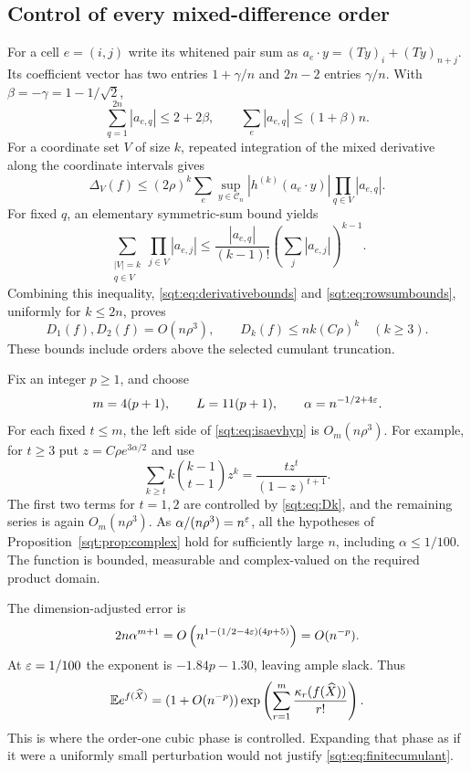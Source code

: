 \subsection{Control of every mixed-difference order}
For a cell $e=(i,j)$ write its whitened pair sum as $a_e\cdot y=(Ty)_i+(Ty)_{n+j}$. Its coefficient vector has two entries $1+\gamma/n$ and $2n-2$ entries $\gamma/n$. With $\beta=-\gamma=1-1/\sqrt2$,
\begin{equation}\label{sqt:eq:rowsumbounds}
\sum_{q=1}^{2n}|a_{e,q}|\leq2+2\beta,\qquad
\sum_e|a_{e,q}|\leq(1+\beta)n.
\end{equation}
For a coordinate set $V$ of size $k$, repeated integration of the mixed derivative along the coordinate intervals gives
\[
\Delta_V(f)\leq(2\rho)^k\sum_e
 \sup_{y\in\mathcal C_n}|h^{(k)}(a_e\cdot y)|
 \prod_{q\in V}|a_{e,q}|.
\]
For fixed $q$, an elementary symmetric-sum bound yields
\[
\sum_{\substack{|V|=k\\q\in V}}\prod_{j\in V}|a_{e,j}|
 \leq\frac{|a_{e,q}|}{(k-1)!}\left(\sum_j|a_{e,j}|\right)^{k-1}.
\]
Combining this inequality, \eqref{sqt:eq:derivativebounds} and \eqref{sqt:eq:rowsumbounds}, uniformly for $k\leq2n$, proves
\begin{equation}\label{sqt:eq:Dk}
D_1(f),D_2(f)=O(n\rho^3),\qquad
D_k(f)\leq nk(C\rho)^k\quad(k\geq3).
\end{equation}
These bounds include orders above the selected cumulant truncation.

Fix an integer $p\geq1$, and choose
\begin{equation}\label{sqt:eq:cutofforders}
m=4(p+1),\qquad L=11(p+1),\qquad\alpha=n^{-1/2+4\varepsilon}.
\end{equation}
For each fixed $t\leq m$, the left side of \eqref{sqt:eq:isaevhyp} is $O_m(n\rho^3)$. For example, for $t\geq3$ put $z=C\rho e^{3\alpha/2}$ and use
\[
\sum_{k\geq t}k\binom{k-1}{t-1}z^k
 =\frac{tz^t}{(1-z)^{t+1}}.
\]
The first two terms for $t=1,2$ are controlled by \eqref{sqt:eq:Dk}, and the remaining series is again $O_m(n\rho^3)$. As
$\alpha/(n\rho^3)=n^\varepsilon$, all the hypotheses of Proposition~\ref{sqt:prop:complex} hold for sufficiently large $n$, including $\alpha\leq1/100$. The function is bounded, measurable and complex-valued on the required product domain.

The dimension-adjusted error is
\[
2n\alpha^{m+1}=O\left(n^{1-(1/2-4\varepsilon)(4p+5)}\right)=O(n^{-p}).
\]
At $\varepsilon=1/100$ the exponent is $-1.84p-1.30$, leaving ample slack. Thus
\begin{equation}\label{sqt:eq:finitecumulant}
\mathbb E e^{f(\widehat X)}
 =(1+O(n^{-p}))\exp\left(\sum_{r=1}^m\frac{\kappa_r(f(\widehat X))}{r!}\right).
\end{equation}
This is where the order-one cubic phase is controlled. Expanding that phase as if it were a uniformly small perturbation would not justify \eqref{sqt:eq:finitecumulant}.

